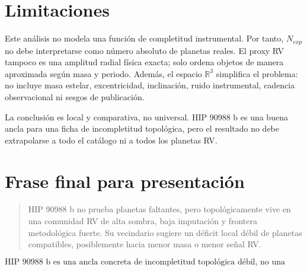 \documentclass[11pt]{article}
\begin{document}
\section{Limitaciones}

Este análisis no modela una función de completitud instrumental. Por tanto, $N_{exp}$ no debe interpretarse como número absoluto de planetas reales. El proxy RV tampoco es una amplitud radial física exacta; solo ordena objetos de manera aproximada según masa y periodo. Además, el espacio $\mathbb{R}^3$ simplifica el problema: no incluye masa estelar, excentricidad, inclinación, ruido instrumental, cadencia observacional ni sesgos de publicación.

La conclusión es local y comparativa, no universal. HIP 90988 b es una buena ancla para una ficha de incompletitud topológica, pero el resultado no debe extrapolarse a todo el catálogo ni a todos los planetas RV.

\section{Frase final para presentación}

\begin{quote}
HIP 90988 b no prueba planetas faltantes, pero topológicamente vive en una comunidad RV de alta sombra, baja imputación y frontera metodológica fuerte. Su vecindario sugiere un déficit local débil de planetas compatibles, posiblemente hacia menor masa o menor señal RV.
\end{quote}

\[
\boxed{
\text{HIP 90988 b es una ancla concreta de incompletitud topológica débil, no una detección de planetas ausentes.}
}
\]
\end{document}

